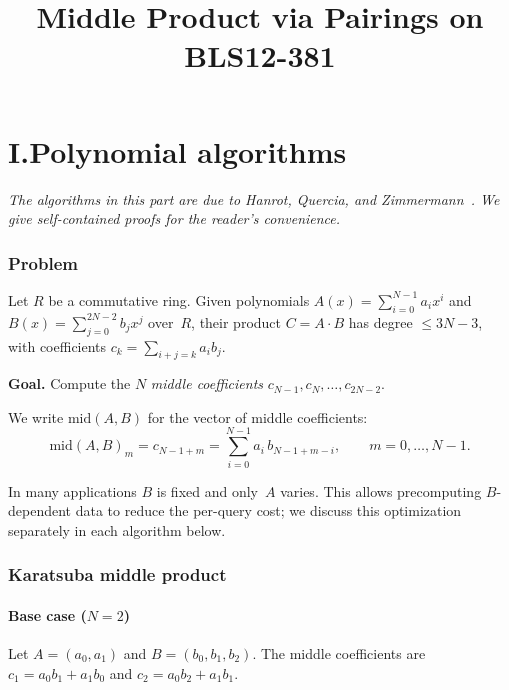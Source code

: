 \documentclass[11pt]{article}
\title{Middle Product via Pairings on BLS12-381}
\author{}
\date{}
\newcommand{\midd}{\mathrm{mid}}
\theoremstyle{plain}
\theoremstyle{remark}
\begin{document}
\maketitle

\part*{I.\quad Polynomial algorithms}

\medskip\noindent\textit{The algorithms in this part are due to
Hanrot, Quercia, and Zimmermann~\cite{HQZ04}.
We give self-contained proofs for the reader's convenience.}

\section{Problem}

Let $R$ be a commutative ring.
Given polynomials
$A(x) = \sum_{i=0}^{N-1} a_i x^i$
and $B(x) = \sum_{j=0}^{2N-2} b_j x^j$
over~$R$,
their product $C = A \cdot B$ has degree $\le 3N{-}3$,
with coefficients
$c_k = \sum_{i+j=k} a_i b_j$.

\medskip\noindent\textbf{Goal.}
Compute the $N$ \emph{middle coefficients}
$c_{N-1}, c_N, \ldots, c_{2N-2}$.

\medskip
We write $\midd(A, B)$ for the vector of middle coefficients:
\begin{equation}\label{eq:mid}
\midd(A,B)_m = c_{N-1+m} = \sum_{i=0}^{N-1} a_i\, b_{N-1+m-i},
\qquad m = 0, \ldots, N{-}1.
\end{equation}

\noindent
In many applications $B$ is fixed and only~$A$ varies.
This allows precomputing $B$-dependent data
to reduce the per-query cost;
we discuss this optimization separately
in each algorithm below.

\section{Karatsuba middle product}

\subsection{Base case ($N = 2$)}

Let $A = (a_0, a_1)$ and $B = (b_0, b_1, b_2)$.
The middle coefficients are
$c_1 = a_0 b_1 + a_1 b_0$
and $c_2 = a_0 b_2 + a_1 b_1$.
\end{document}
